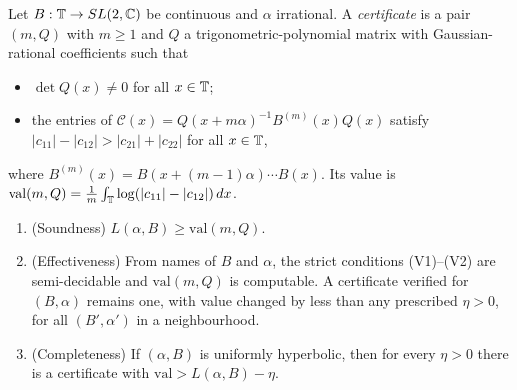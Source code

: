 \begin{lemma}[Certificates]\label{lem:cert}
Let $B:\mathbb T\to SL(2,\mathbb C)$ be continuous and $\alpha$ irrational. A \emph{certificate} is a pair $(m,Q)$ with $m\ge1$ and $Q$ a trigonometric-polynomial matrix with Gaussian-rational coefficients such that
\begin{itemize}
\item[(V1)] $\det Q(x)\ne0$ for all $x\in\mathbb T$;
\item[(V2)] the entries of $\mathcal C(x)=Q(x+m\alpha)^{-1}B^{(m)}(x)Q(x)$ satisfy $|c_{11}|-|c_{12}|>|c_{21}|+|c_{22}|$ for all $x\in\mathbb T$,
\end{itemize}
where $B^{(m)}(x)=B(x+(m-1)\alpha)\cdots B(x)$. Its value is $\mathrm{val}(m,Q)=\frac1m\int_\mathbb T\log(|c_{11}|-|c_{12}|)\,dx$.
\begin{enumerate}
\item (Soundness) $L(\alpha,B)\ge\mathrm{val}(m,Q)$.
\item (Effectiveness) From names of $B$ and $\alpha$, the strict conditions (V1)--(V2) are semi-decidable and $\mathrm{val}(m,Q)$ is computable. A certificate verified for $(B,\alpha)$ remains one, with value changed by less than any prescribed $\eta>0$, for all $(B',\alpha')$ in a neighbourhood.
\item (Completeness) If $(\alpha,B)$ is uniformly hyperbolic, then for every $\eta>0$ there is a certificate with $\mathrm{val}>L(\alpha,B)-\eta$.
\end{enumerate}
\end{lemma}

